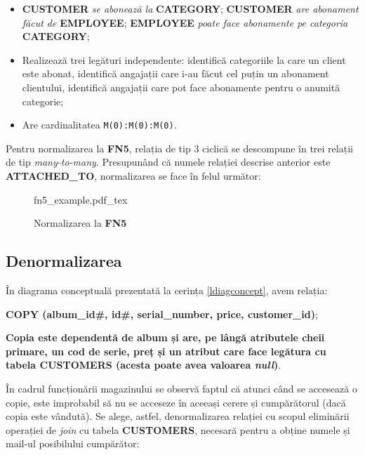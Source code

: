\documentclass[a4paper, oneside, 12pt]{article}
\newcommand{\incfig}[1]{%
    \def\svgwidth{\columnwidth}
    {#1.pdf_tex}
}
\begin{document}
\begin{itemize}[label=\textbullet, noitemsep, topsep=0pt, after=]
        \item \textbf{CUSTOMER} \emph{se abonează la} \textbf{CATEGORY};
              \textbf{CUSTOMER} \emph{are abonament făcut de} \textbf{EMPLOYEE};
              \textbf{EMPLOYEE} \emph{poate face abonamente pe categoria} \textbf{CATEGORY};
        \item Realizează trei legături independente: identifică
              categoriile la care un client este abonat, identifică
              angajații care i-au făcut cel puțin un abonament
              clientului, identifică angajații care pot face
              abonamente pentru o anumită categorie;
        \item Are cardinalitatea \texttt{M(0):M(0):M(0)}.

\end{itemize}

Pentru normalizarea la \textbf{FN5}, relația de tip 3 ciclică se
descompune în trei relații de tip \emph{many-to-many}. Presupunând că numele relației descrise
anterior este \textbf{ATTACHED\_TO}, normalizarea se face în felul următor:

\begin{figure}[H]
    \centering
    \incfig{fn5_example}
    \caption{Normalizarea la \textbf{FN5}}
    \label{fig:norm5}
\end{figure}

\subsection{Denormalizarea}

În diagrama conceptuală prezentată la cerința \ref{ldiagconcept}, avem relația:

\begin{m_itemize}[after=]
        \item \textbf{COPY (album\_id\#, id\#, serial\_number, price, customer\_id)};
        \item \textbf{Copia este dependentă de album și are, pe lângă
              atributele cheii primare, un cod de serie, preț și un atribut
              care face legătura cu tabela CUSTOMERS (acesta poate avea valoarea
\emph{null})}.
\end{m_itemize}

În cadrul funcționării magazinului se observă faptul că atunci când se
accesează o copie, este improbabil să nu se acceseze în aceeași cerere și
cumpărătorul (dacă copia este vândută). Se alege, astfel, denormalizarea
relației cu scopul eliminării operației de \emph{join} cu tabela
\textbf{CUSTOMERS}, necesară pentru a obține numele și mail-ul posibilului
cumpărător:
\end{document}
